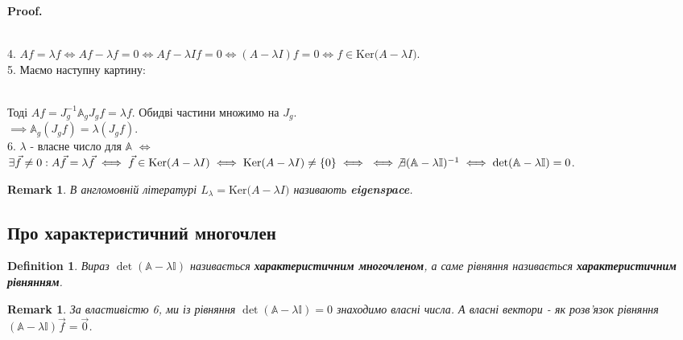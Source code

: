 \documentclass[a4paper, 10pt]{article}
\makeatletter
\def\qed{$\blacksquare$}
\def\ker#1{\textrm{Ker} {#1}}
\theoremstyle{theoremdd}
\theoremstyle{theoremdd}
\newtheorem{definition}[theorem]{Definition}
\theoremstyle{theoremdd}
\theoremstyle{theoremdd}
\theoremstyle{theoremdd}
\theoremstyle{theoremdd}
\newtheorem{remark}[theorem]{Remark}
\theoremstyle{theoremdd}
\theoremstyle{theoremdd}
\renewenvironment{proof}[1][Proof.\\]{\par
\pushQED{\hfill \qed}%
\normalfont \topsep6\p@\@plus6\p@\relax
\trivlist
\item\relax
{\bfseries
#1\@addpunct{.}}\hspace\labelsep\ignorespaces
}{%
\popQED\endtrivlist\@endpefalse
}
\makeatother
\begin{document}
\begin{proof}
\bigskip \\
4. $Af = \lambda f \iff Af - \lambda f = 0 \iff Af - \lambda If = 0 \iff (A-\lambda I)f = 0 \iff f \in \ker(A - \lambda I)$.
\bigskip \\
5. Маємо наступну картину:\\
\\
Тоді $Af = J_g^{-1} \mathbb{A}_g J_g f = \lambda f$. Обидві частини множимо на $J_g$.\\
$\implies \mathbb{A}_g (J_g f) = \lambda (J_g f)$.
\bigskip \\
6. $\lambda$ - власне число для $\mathbb{A}$ $\iff$ $\exists \vec{f} \neq 0: A \vec{f} = \lambda \vec{f} \iff \vec{f} \in \ker (A-\lambda I) \iff \ker (A-\lambda I) \neq \{0\} \iff \\ \iff \not\exists (\mathbb{A} - \lambda \mathbb{I})^{-1} \iff \det (\mathbb{A} - \lambda \mathbb{I}) = 0$.
\end{proof}

\begin{remark}
В англомовній літературі $L_{\lambda} = \ker (A - \lambda I)$ називають \textbf{eigenspace}.
\end{remark}

\subsection{Про характеристичний многочлен}
\begin{definition}
Вираз $\det(\mathbb{A} - \lambda \mathbb{I})$ називається \textbf{характеристичним многочленом}, а саме рівняння називається \textbf{характеристичним рівнянням}.
\end{definition}

\begin{remark}
За властивістю 6, ми із рівняння $\det (\mathbb{A} - \lambda \mathbb{I}) = 0$ знаходимо власні числа. А власні вектори - як розв'язок рівняння $(\mathbb{A} - \lambda \mathbb{I})\vec{f} = \vec{0}$.
\end{remark}
\end{document}
